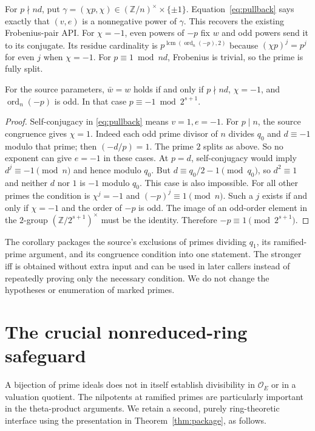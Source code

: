 \documentclass[11pt]{article}
\newcommand{\Z}{\mathbb Z}\newcommand{\Q}{\mathbb Q}\newcommand{\F}{\mathbb F}\newcommand{\OO}{\mathcal O}\newcommand{\Tr}{\operatorname{Tr}}\newcommand{\ord}{\operatorname{ord}}\newcommand{\lcm}{\operatorname{lcm}}\newcommand{\codiff}{\mathfrak D^{-1}}\newcommand{\src}[2]{\href{https://github.com/VladimirReshetnikov/ProveIt/blob/fd695fd462aa31b25af3335e2a9c3b6e014b055f/Analysis/GeneralizedRiemannHypothesis/Lean/grh/src/#1}{#2}}
\begin{document}
For $p\nmid nd$, put $\gamma=(\chi p,\chi)\in(\Z/n)^\times\times\{\pm1\}$. Equation~\eqref{eq:pullback} says exactly that $(v,e)$ is a nonnegative power of $\gamma$. This recovers the existing Frobenius-pair API. For $\chi=-1$, even powers of $-p$ fix $w$ and odd powers send it to its conjugate. Its residue cardinality is $p^{\lcm(\ord_n(-p),2)}$ because $(\chi p)^j=p^j$ for even $j$ when $\chi=-1$. For $p\equiv1\bmod nd$, Frobenius is trivial, so the prime is fully split.

\begin{corollary}\label{cor:star}
For the source parameters, $\bar w=w$ holds if and only if $p\nmid nd$, $\chi=-1$, and $\ord_n(-p)$ is odd. In that case $p\equiv-1\bmod 2^{s+1}$.
\end{corollary}
\begin{proof}
Self-conjugacy in \eqref{eq:pullback} means $v=1,e=-1$. For $p\mid n$, the source congruence gives $\chi=1$. Indeed each odd prime divisor of $n$ divides $q_0$ and $d\equiv-1$ modulo that prime; then $(-d/p)=1$. The prime $2$ splits as above. So no exponent can give $e=-1$ in these cases. At $p=d$, self-conjugacy would imply $d^j\equiv-1\pmod n$ and hence modulo $q_0$. But $d\equiv q_0/2-1\pmod{q_0}$, so $d^2\equiv1$ and neither $d$ nor $1$ is $-1$ modulo $q_0$. This case is also impossible. For all other primes the condition is $\chi^j=-1$ and $(-p)^j\equiv1\pmod n$. Such a $j$ exists if and only if $\chi=-1$ and the order of $-p$ is odd. The image of an odd-order element in the $2$-group $(\Z/2^{s+1})^\times$ must be the identity. Therefore $-p\equiv1\pmod{2^{s+1}}$.
\end{proof}

The corollary packages the source's exclusions of primes dividing $q_1$, its ramified-prime argument, and its congruence condition into one statement. The stronger iff is obtained without extra input and can be used in later callers instead of repeatedly proving only the necessary condition. We do not change the hypotheses or enumeration of marked primes.

\section{The crucial nonreduced-ring safeguard}
A bijection of prime ideals does not in itself establish divisibility in $\OO_E$ or in a valuation quotient. The nilpotents at ramified primes are particularly important in the theta-product arguments. We retain a second, purely ring-theoretic interface using the presentation in Theorem~\ref{thm:package}, as follows.
\end{document}

